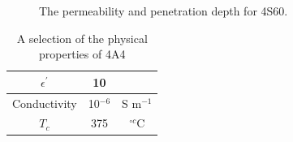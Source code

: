 \begin{figure}
\caption{The permeability  and penetration depth  for 4S60.}
\end{figure}

\begin{table}
\caption{A selection of the physical properties of 4A4}
\label{tab:4a4Prop}
\begin{center}
\begin{tabular}{c | c | c}
$\epsilon^{'}$ & 10 & \\ \hline
Conductivity  & 10$^{-6}$ & S m$^{-1}$\\ \hline
$T_{c}$ & 375 & $^{\circ c}$C \\
\end{tabular}
\end{center}
\end{table}

